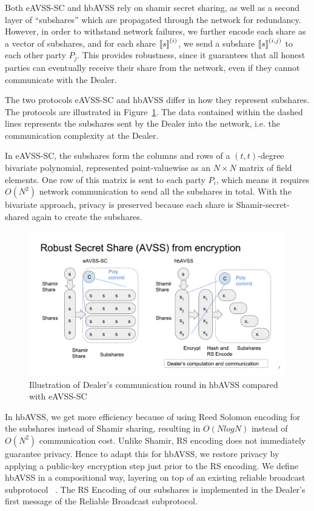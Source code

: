 \documentclass{sig-alternate-05-2015}
\begin{document}
Both eAVSS-SC and hbAVSS rely on shamir secret sharing, as well as a second layer of ``subshares'' which are propagated through the network for redundancy. However, in order to withstand network failures, we further encode each share as a vector of subshares, and for each share ${ \llbracket {s} \rrbracket }^{(i)}$, we send a subshare ${ \llbracket {s} \rrbracket }^{(i,j)}$ to each other party $P_j$. This provides robustness, since it guarantees that all honest parties can eventually receive their share from the network, even if they cannot communicate with the Dealer.

The two protocols eAVSS-SC and hbAVSS differ in how they represent subshares. The protocols are illustrated in Figure~\ref{fig:avss-illustrate}. The data contained within the dashed lines represents the subshares sent by the Dealer into the network, i.e. the communication complexity at the Dealer.

In eAVSS-SC, the subshares form the columns and rows of a $(t,t)$-degree bivariate polynomial, represented point-valuewise as an $N \times N$ matrix of field elements. One row of this matrix is sent to each party $P_i$, which means it requires $O(N^2)$ network communication to send all the subshares in total. With the bivariate approach, privacy is preserved because each share is Shamir-secret-shared again to create the subshares.

\begin{figure}
  \centering
  \includegraphics[width=\columnwidth]{graphics/avss-illustration}
  \caption{Illustration of Dealer's communication round in hbAVSS compared with eAVSS-SC}
  \label{fig:avss-illustrate}
\end{figure}

In hbAVSS, we get more efficiency because of using Reed Solomon encoding for the subshares instead of Shamir sharing, resulting in $O(N log N)$ instead of $O(N^2)$ communication cost.
Unlike Shamir, RS encoding does not immediately guarantee privacy. Hence to adapt this for hbAVSS, we restore privacy by applying a public-key encryption step just prior to the RS encoding.
We define hbAVSS in a compositional way, layering on top of an existing reliable broadcast subprotocol ~\cite{dispersal}. The RS Encoding of our subshares is implemented in the Dealer's first message of the Reliable Broadcast subprotocol.
\end{document}
